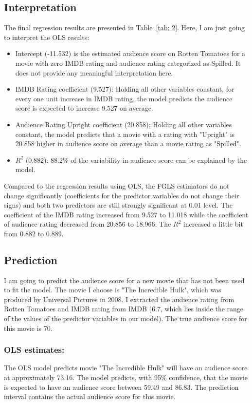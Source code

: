 \documentclass{article}
\begin{document}
\subsection{Interpretation}
The final regression results are presented in Table~\ref{tab: 2}. Here, I am just going to interpret the OLS results:
\vspace{-0.5cm}
\begin{itemize}
\setlength\itemsep{-0.5em}
\item Intercept (-11.532) is the estimated audience score on Rotten Tomatoes for a movie with zero IMDB rating and audience rating categorized as Spilled. It does not provide any meaningful interpretation here.
\item IMDB Rating coefficient (9.527): Holding all other variables constant, for every one unit increase in IMDB rating, the model predicts the audience score is expected to increase  9.527 on average.
\item Audience Rating Upright coefficient (20.858): Holding all other variables constant, the model predicts that a movie with a rating with "Upright" is 20.858 higher in audience score on average than a movie rating as "Spilled".
\item $R^2$ (0.882): 88.2\% of the variability in audience score can be explained by the model.
\end{itemize}

Compared to the regression results using OLS, the FGLS estimators do not change significantly (coefficients for the predictor variables do not change their signs) and both two predictors are still strongly significant at 0.01 level. The coefficient of the IMDB rating increased from 9.527 to 11.018 while the coefficient of audience rating decreased from 20.856 to 18.966. The $R^2$ increased a little bit from 0.882 to 0.889.


\subsection{Prediction}
I am going to predict the audience score for a new movie that has not been used to fit the model. The movie I choose is "The Incredible Hulk", which was produced by Universal Pictures in 2008. I extracted the audience rating from Rotten Tomatoes and IMDB rating from IMDB (6.7, which lies inside the range of the values of the predictor variables in our model). The true audience 
score for this movie is 70.
\vspace{-0.5cm}
\subsubsection{OLS estimates:}
The OLS model predicts movie "The Incredible Hulk" will have an audience score at approximately 73.16. The model predicts, with 95\% confidence, that the movie is expected to have an audience score between 59.49 and 86.83. The prediction interval contains the actual audience score for this movie.
\vspace{-0.5cm}
\end{document}

